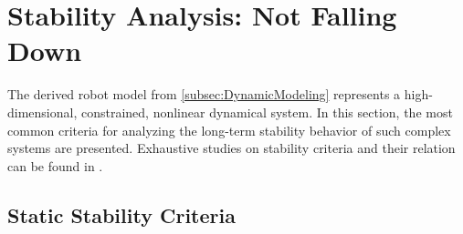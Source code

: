 

\section{Stability Analysis: Not Falling Down}
The derived robot model from \cref{subsec:DynamicModeling} represents a high-dimensional, constrained, nonlinear dynamical system. In this section, the most common criteria  for analyzing the long-term stability behavior of such complex systems are presented. Exhaustive studies on stability criteria and their relation can be found in \cite{garcia2002classification, dekker2009zero, siciliano2016springer}.

\subsection{Static Stability Criteria}
